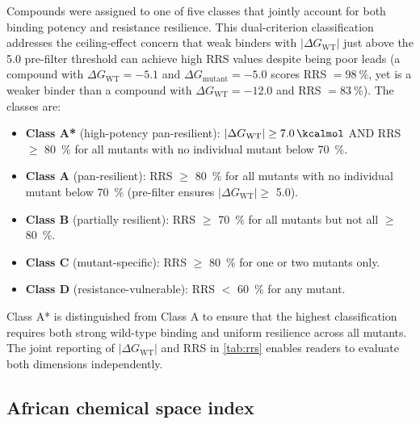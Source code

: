 \documentclass[11pt,a4paper]{article}
\begin{document}
Compounds were assigned to one of five classes that jointly account for both binding potency and resistance resilience. This dual-criterion classification addresses the ceiling-effect concern that weak binders with $|\Delta G_{\mathrm{WT}}|$ just above the \SI{5.0}{\kcalmol} pre-filter threshold can achieve high RRS values despite being poor leads (a compound with $\Delta G_{\mathrm{WT}} = -5.1$ and $\Delta G_{\mathrm{mutant}} = -5.0$ scores RRS $= \qty{98}{\percent}$, yet is a weaker binder than a compound with $\Delta G_{\mathrm{WT}} = -12.0$ and RRS $= \qty{83}{\percent}$). The classes are:
\begin{itemize}
    \item \textbf{Class A*} (high-potency pan-resilient): $|\Delta G_{\mathrm{WT}}| \geq \SI{7.0}{\kcalmol}$ AND RRS $\geq$ \qty{80}{\percent} for all mutants with no individual mutant below \qty{70}{\percent}.
    \item \textbf{Class A} (pan-resilient): RRS $\geq$ \qty{80}{\percent} for all mutants with no individual mutant below \qty{70}{\percent} (pre-filter ensures $|\Delta G_{\mathrm{WT}}| \geq$ \SI{5.0}{\kcalmol}).
    \item \textbf{Class B} (partially resilient): RRS $\geq$ \qty{70}{\percent} for all mutants but not all $\geq$ \qty{80}{\percent}.
    \item \textbf{Class C} (mutant-specific): RRS $\geq$ \qty{80}{\percent} for one or two mutants only.
    \item \textbf{Class D} (resistance-vulnerable): RRS $<$ \qty{60}{\percent} for any mutant.
\end{itemize}
Class A* is distinguished from Class A to ensure that the highest classification requires both strong wild-type binding and uniform resilience across all mutants. The joint reporting of $|\Delta G_{\mathrm{WT}}|$ and RRS in \cref{tab:rrs} enables readers to evaluate both dimensions independently.

\subsection{African chemical space index}
\end{document}
